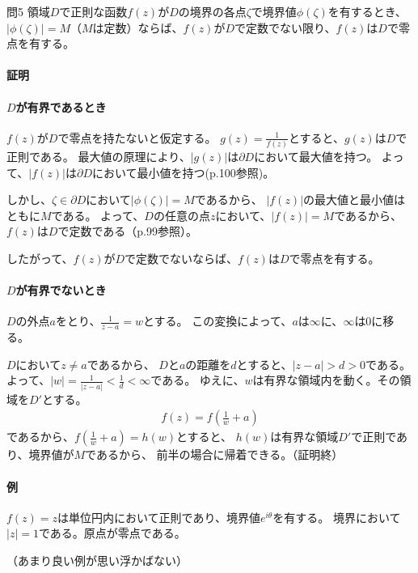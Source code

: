 \begin{mysimplebox}{問5}
    領域$D$で正則な函数$f(z)$が$D$の境界の各点$\zeta$で境界値$\phi(\zeta)$を有するとき、
    $|\phi(\zeta)|=M$（$M$は定数）ならば、$f(z)$が$D$で定数でない限り、$f(z)$は$D$で零点を有する。
\end{mysimplebox}
\paragraph{証明}
\paragraph{$D$が有界であるとき}

$f(z)$が$D$で零点を持たないと仮定する。
$g(z)=\frac{1}{f(z)}$とすると、$g(z)$は$D$で正則である。
最大値の原理により、$|g(z)|$は$\partial D$において最大値を持つ。
よって、$|f(z)|$は$\partial D$において最小値を持つ(p.100参照)。

しかし、$\zeta\in\partial D$において$|\phi(\zeta)|=M$であるから、
$|f(z)|$の最大値と最小値はともに$M$である。
よって、$D$の任意の点$z$において、$|f(z)|=M$であるから、
$f(z)$は$D$で定数である（p.99参照）。

したがって、$f(z)$が$D$で定数でないならば、$f(z)$は$D$で零点を有する。

\paragraph{$D$が有界でないとき}
$D$の外点$a$をとり、$\frac{1}{z-a}=w$とする。
この変換によって、$a$は$\infty$に、$\infty$は0に移る。

$D$において$z\neq a$であるから、
$D$と$a$の距離を$d$とすると、$|z-a|>d>0$である。
よって、$|w|=\frac{1}{|z-a|}<\frac{1}{d}<\infty$である。
ゆえに、$w$は有界な領域内を動く。その領域を$D'$とする。
\begin{align*}
    f(z)=f\left(\frac{1}{w}+a\right)
\end{align*}
であるから、$f\left(\frac{1}{w}+a\right)=h(w)$とすると、
$h(w)$は有界な領域$D'$で正則であり、境界値が$M$であるから、
前半の場合に帰着できる。（証明終）

\paragraph{例}
$f(z)=z$は単位円内において正則であり、境界値$e^{i\theta}$を有する。
境界において$|z|=1$である。原点が零点である。

（あまり良い例が思い浮かばない）

